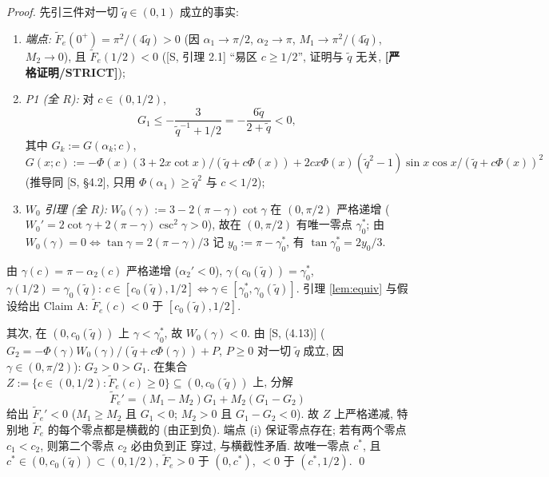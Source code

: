 \documentclass[UTF8]{ctexart}
\newcommand{\STRICT}{\textbf{[严格证明/STRICT]}}
\begin{document}
\begin{proof}
先引三件对一切 $\tilde q\in(0,1)$ 成立的事实:
\begin{enumerate}
	\item[(i)] \emph{端点:} $\widetilde F_e(0^+)=\pi^2/(4\tilde q)>0$ (因
		$\alpha_1\to\pi/2$, $\alpha_2\to\pi$, $M_1\to\pi^2/(4\tilde q)$, $M_2\to0$),
		且 $\widetilde F_e(1/2)<0$ ([S, 引理 2.1] ``易区 $c\ge1/2$'', 证明与
		$\tilde q$ 无关, \STRICT);
	\item[(ii)] \emph{P1 (全 $R$):} 对 $c\in(0,1/2)$,
		\begin{equation}
			G_1\le-\frac{3}{\tilde q^{-1}+1/2}=-\frac{6\tilde q}{2+\tilde q}<0,
			\label{eq:G1allR}
		\end{equation}
		其中 $G_k:=G(\alpha_k;c)$, $G(x;c):=-\Phi(x)(3+2x\cot x)/(\tilde q+c\Phi(x))
		+2cx\Phi(x)(\tilde q^2-1)\sin x\cos x/(\tilde q+c\Phi(x))^2$
		(推导同 [S, \S4.2], 只用 $\Phi(\alpha_1)\ge\tilde q^2$ 与 $c<1/2$);
	\item[(iii)] \emph{$W_0$ 引理 (全 $R$):} $W_0(\gamma):=3-2(\pi-\gamma)\cot\gamma$
		在 $(0,\pi/2)$ 严格递增 ($W_0'=2\cot\gamma+2(\pi-\gamma)\csc^2\gamma>0$),
		故在 $(0,\pi/2)$ 有唯一零点 $\gamma_0^*$; 由
		$W_0(\gamma)=0\iff\tan\gamma=2(\pi-\gamma)/3$ 记 $y_0:=\pi-\gamma_0^*$,
		有 $\tan\gamma_0^*=2y_0/3$.
\end{enumerate}
由 $\gamma(c)=\pi-\alpha_2(c)$ 严格递增 ($\alpha_2'<0$), $\gamma(c_0(\tilde q))
=\gamma_0^*$, $\gamma(1/2)=\gamma_0(\tilde q)$: $c\in[c_0(\tilde q),1/2]
\iff\gamma\in[\gamma_0^*,\gamma_0(\tilde q)]$. 引理 \ref{lem:equiv} 与假设给出
Claim A: $\widetilde F_e(c)<0$ 于 $[c_0(\tilde q),1/2]$.

其次, 在 $(0,c_0(\tilde q))$ 上 $\gamma<\gamma_0^*$, 故 $W_0(\gamma)<0$. 由
[S, (4.13)] ($G_2=-\Phi(\gamma)W_0(\gamma)/(\tilde q+c\Phi(\gamma))+P$,
$P\ge0$ 对一切 $\tilde q$ 成立, 因 $\gamma\in(0,\pi/2)$):
$G_2>0>G_1$. 在集合 $Z:=\{c\in(0,1/2):\widetilde F_e(c)\ge0\}\subseteq(0,c_0(\tilde q))$
上, 分解
\begin{equation}
	\widetilde F_e'=(M_1-M_2)G_1+M_2(G_1-G_2)
	\label{eq:Fep}
\end{equation}
给出 $\widetilde F_e'<0$ ($M_1\ge M_2$ 且 $G_1<0$; $M_2>0$ 且 $G_1-G_2<0$).
故 $Z$ 上严格递减, 特别地 $\widetilde F_e$ 的每个零点都是横截的 (由正到负).
端点 (i) 保证零点存在; 若有两个零点 $c_1<c_2$, 则第二个零点 $c_2$ 必由负到正
穿过, 与横截性矛盾. 故唯一零点 $c^*$, 且 $c^*\in(0,c_0(\tilde q))\subset(0,1/2)$,
$\widetilde F_e>0$ 于 $(0,c^*)$, $<0$ 于 $(c^*,1/2)$. \qed
\end{proof}
\end{document}
